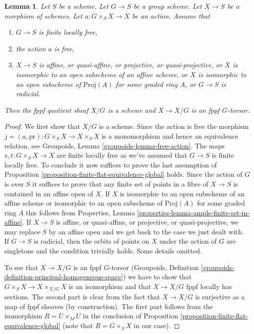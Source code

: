 \documentclass{stacks-project}
\theoremstyle{plain}
\newtheorem{lemma}[subsection]{Lemma}
\theoremstyle{definition}
\theoremstyle{remark}
\numberwithin{equation}{subsection}
\begin{document}
\begin{lemma}
\label{lemma-quotient-scheme}
Let $S$ be a scheme. Let $G \to S$ be a group scheme. Let $X \to S$ be
a morphism of schemes. Let $a : G \times_S X \to X$ be an action. Assume that
\begin{enumerate}
\item $G \to S$ is finite locally free,
\item the action $a$ is free,
\item $X \to S$ is affine, or quasi-affine, or projective, or
quasi-projective, or $X$ is isomorphic to an open subscheme of an
affine scheme, or $X$ is isomorphic to an open subscheme of $\text{Proj}(A)$
for some graded ring $A$, or $G \to S$ is radicial.
\end{enumerate}
Then the fppf quotient sheaf $X/G$ is a scheme and $X \to X/G$
is an fppf $G$-torsor.
\end{lemma}

\begin{proof}
We first show that $X/G$ is a scheme. Since the action is free the morphism
$j = (a, \text{pr}) : G \times_S X \to X \times_S X$
is a monomorphism and hence an equivalence relation, see
Groupoids, Lemma \ref{groupoids-lemma-free-action}. The maps
$s, t : G \times_S X \to X$
are finite locally free as we've assumed that $G \to S$ is finite locally
free. To conclude it now suffices to prove the last assumption of
Proposition \ref{proposition-finite-flat-equivalence-global} holds.
Since the action of $G$ is over $S$ it suffices to prove that
any finite set of points in a fibre of $X \to S$ is contained in an
affine open of $X$. If $X$ is isomorphic to an open subscheme of an
affine scheme or isomorphic to an open subscheme of $\text{Proj}(A)$
for some graded ring $A$ this follows from
Properties, Lemma \ref{properties-lemma-ample-finite-set-in-affine}.
If $X \to S$ is affine, or quasi-affine, or projective, or
quasi-projective, we may replace $S$ by an affine open and we
get back to the case we just dealt with. If $G \to S$ is radicial,
then the orbits of points on $X$ under the action of $G$ are singletons
and the condition trivially holds. Some details omitted.

\medskip\noindent
To see that $X \to X/G$ is an fppf $G$-torsor
(Groupoids, Definition \ref{groupoids-definition-principal-homogeneous-space})
we have to show that $G \times_S X \to X \times_{X/G} X$
is an isomorphism and that $X \to X/G$ fppf locally has sections.
The second part is clear from the fact that $X \to X/G$ is surjective
as a map of fppf sheaves (by construction). The first part follows from
the isomorphism $R = U \times_M U$ in the conclusion of
Proposition \ref{proposition-finite-flat-equivalence-global}
(note that $R = G \times_S X$ in our case).
\end{proof}
\end{document}
